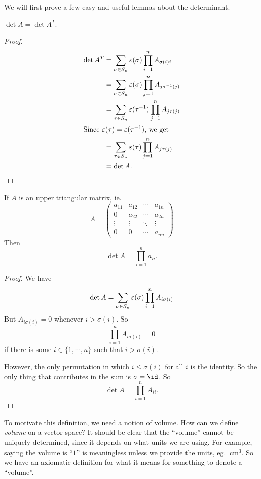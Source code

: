 \documentclass[a4paper]{article}
\begin{document}
We will first prove a few easy and useful lemmas about the determinant.
\begin{lemma}
  $\det A = \det A^T$.
\end{lemma}

\begin{proof}
  \begin{align*}
    \det A^T &= \sum_{\sigma \in S_n} \varepsilon(\sigma) \prod_{i = 1}^n A_{\sigma(i)i}\\
    &= \sum_{\sigma \in S_n} \varepsilon (\sigma) \prod_{j = 1}^n A_{j \sigma^{-1}(j)}\\
    &= \sum_{\tau \in S_n} \varepsilon (\tau^{-1}) \prod_{j = 1}^n A_{j \tau (j)}\\
    \intertext{Since $\varepsilon(\tau) = \varepsilon(\tau^{-1})$, we get}
    &= \sum_{\tau \in S_n} \varepsilon (\tau) \prod_{j = 1}^n A_{j \tau (j)}\\
    &= \det A.
  \end{align*}
\end{proof}

\begin{lemma}
  If $A$ is an upper triangular matrix, ie.
  \[
    A =
    \begin{pmatrix}
      a_{11} & a_{12} & \cdots & a_{1n}\\
      0 & a_{22} & \cdots & a_{2n}\\
      \vdots & \vdots & \ddots & \vdots\\
      0 & 0 & \cdots & a_{nn}
    \end{pmatrix}
  \]
  Then
  \[
    \det A = \prod_{i = 1}^n a_{ii}.
  \]
\end{lemma}

\begin{proof}
  We have
  \[
    \det A = \sum_{\sigma \in S_n} \varepsilon(\sigma) \prod_{i = 1}^n A_{i\sigma (i)}\\
  \]
  But $A_{i \sigma(i)} = 0$ whenever $i > \sigma(i)$. So
  \[
    \prod_{i = 1}^n A_{i\sigma(i)} = 0
  \]
  if there is some $i \in \{1, \cdots, n\}$ such that $i > \sigma(i)$.

  However, the only permutation in which $i \leq \sigma(i)$ for all $i$ is the identity. So the only thing that contributes in the sum is $\sigma = \id$. So
  \[
    \det A = \prod_{i = 1}^n A_{ii}.
  \]
\end{proof}
To motivate this definition, we need a notion of volume. How can we define \emph{volume} on a vector space? It should be clear that the ``volume'' cannot be uniquely determined, since it depends on what units we are using. For example, saying the volume is ``$1$'' is meaningless unless we provide the units, eg. $\SI{}{\centi\meter\cubed}$. So we have an axiomatic definition for what it means for something to denote a ``volume''.
\end{document}
